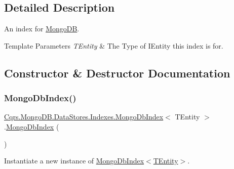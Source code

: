\subsection{Detailed Description}
An index for \hyperlink{namespaceCqrs_1_1MongoDB}{Mongo\+DB}. 


\begin{DoxyTemplParams}{Template Parameters}
{\em T\+Entity} & The Type of I\+Entity this index is for.\\
\hline
\end{DoxyTemplParams}


\subsection{Constructor \& Destructor Documentation}
\mbox{\label{classCqrs_1_1MongoDB_1_1DataStores_1_1Indexes_1_1MongoDbIndex_a61f4b17dd968f92e81562c70ae062a89_a61f4b17dd968f92e81562c70ae062a89}} 
\subsubsection{\texorpdfstring{Mongo\+Db\+Index()}{MongoDbIndex()}}
{\footnotesize\ttfamily \hyperlink{classCqrs_1_1MongoDB_1_1DataStores_1_1Indexes_1_1MongoDbIndex}{Cqrs.\+Mongo\+D\+B.\+Data\+Stores.\+Indexes.\+Mongo\+Db\+Index}$<$ T\+Entity $>$.\hyperlink{classCqrs_1_1MongoDB_1_1DataStores_1_1Indexes_1_1MongoDbIndex}{Mongo\+Db\+Index} (\begin{DoxyParamCaption}{ }\end{DoxyParamCaption})\hspace{0.3cm}{\ttfamily [protected]}}



Instantiate a new instance of \hyperlink{classCqrs_1_1MongoDB_1_1DataStores_1_1Indexes_1_1MongoDbIndex_a61f4b17dd968f92e81562c70ae062a89_a61f4b17dd968f92e81562c70ae062a89}{Mongo\+Db\+Index$<$\+T\+Entity$>$}. 



